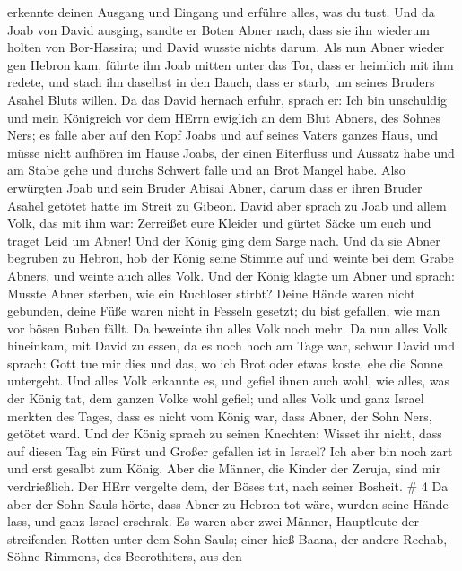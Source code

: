 erkennte deinen Ausgang und Eingang und erführe alles, was du tust.
 Und da Joab von David ausging, sandte er Boten Abner nach,
dass sie ihn wiederum holten von Bor-Hassira; und David wusste nichts
darum.  Als nun Abner wieder gen Hebron kam, führte ihn
Joab mitten unter das Tor, dass er heimlich mit ihm redete, und stach
ihn daselbst in den Bauch, dass er starb, um seines Bruders Asahel Bluts
willen.  Da das David hernach erfuhr, sprach er: Ich bin
unschuldig und mein Königreich vor dem HErrn ewiglich an dem Blut
Abners, des Sohnes Ners;  es falle aber auf den Kopf Joabs
und auf seines Vaters ganzes Haus, und müsse nicht aufhören im Hause
Joabs, der einen Eiterfluss und Aussatz habe und am Stabe gehe und
durchs Schwert falle und an Brot Mangel habe.  Also
erwürgten Joab und sein Bruder Abisai Abner, darum dass er ihren Bruder
Asahel getötet hatte im Streit zu Gibeon.  David aber
sprach zu Joab und allem Volk, das mit ihm war: Zerreißet eure Kleider
und gürtet Säcke um euch und traget Leid um Abner! Und der König ging
dem Sarge nach.  Und da sie Abner begruben zu Hebron, hob
der König seine Stimme auf und weinte bei dem Grabe Abners, und weinte
auch alles Volk.  Und der König klagte um Abner und sprach:
Musste Abner sterben, wie ein Ruchloser stirbt?  Deine
Hände waren nicht gebunden, deine Füße waren nicht in Fesseln gesetzt;
du bist gefallen, wie man vor bösen Buben fällt. Da beweinte ihn alles
Volk noch mehr.  Da nun alles Volk hineinkam, mit David zu
essen, da es noch hoch am Tage war, schwur David und sprach: Gott tue
mir dies und das, wo ich Brot oder etwas koste, ehe die Sonne untergeht.
 Und alles Volk erkannte es, und gefiel ihnen auch wohl,
wie alles, was der König tat, dem ganzen Volke wohl gefiel;
 und alles Volk und ganz Israel merkten des Tages, dass es
nicht vom König war, dass Abner, der Sohn Ners, getötet ward.
 Und der König sprach zu seinen Knechten: Wisset ihr nicht,
dass auf diesen Tag ein Fürst und Großer gefallen ist in Israel?
 Ich aber bin noch zart und erst gesalbt zum König. Aber
die Männer, die Kinder der Zeruja, sind mir verdrießlich. Der HErr
vergelte dem, der Böses tut, nach seiner Bosheit. \# 4  Da
aber der Sohn Sauls hörte, dass Abner zu Hebron tot wäre, wurden seine
Hände lass, und ganz Israel erschrak.  Es waren aber zwei
Männer, Hauptleute der streifenden Rotten unter dem Sohn Sauls; einer
hieß Baana, der andere Rechab, Söhne Rimmons, des Beerothiters, aus den
